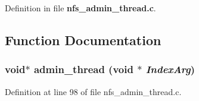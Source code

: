 Definition in file {\bf nfs\_\-admin\_\-thread.c}.

\subsection{Function Documentation}
\subsubsection{\setlength{\rightskip}{0pt plus 5cm}void$\ast$ admin\_\-thread (void $\ast$ {\em Index\-Arg})}\label{nfs__admin__thread_8c_a0}




Definition at line 98 of file nfs\_\-admin\_\-thread.c.